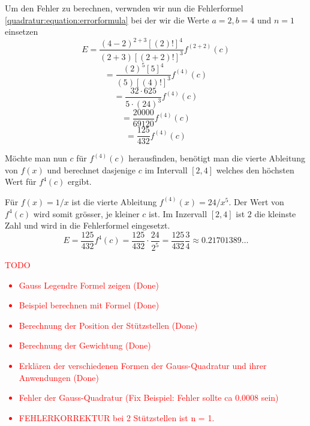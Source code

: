Um den Fehler zu berechnen, verwnden wir nun die Fehlerformel \ref{quadratur:equation:errorformula}
bei der wir die Werte $a = 2, b = 4$ und $n = 1$ einsetzen
\begin{equation*}
    E = \frac{(4-2)^{2+3}[(2)!]^{4}}{(2+3)[(2+2)!]^{3}}f^{(2+2)}(c)
\end{equation*}
\begin{equation*}
    = \frac{(2)^{5}[5]^{4}}{(5)[(4)!]^{3}}f^{(4)}(c)
\end{equation*}
\begin{equation*}
    = \frac{32 \cdot 625}{5 \cdot (24)^{3}}f^{(4)}(c)
\end{equation*}
\begin{equation*}
    = \frac{20000}{69120}f^{(4)}(c)
\end{equation*}
\begin{equation}
    = \frac{125}{432}f^{(4)}(c)
\end{equation}

Möchte man nun $c$ für $f^{(4)}(c)$ herausfinden, benötigt man die 
vierte Ableitung von $f(x)$ und berechnet dasjenige $c$ im Intervall $[2, 4]$ 
welches den höchsten Wert für $f^{4}(c)$ ergibt.

Für $f(x) = 1/x$ ist die vierte Ableitung $f^{(4)}(x) = 24/x^{5}$. 
Der Wert von $f^{4}(c)$ wird somit grösser, je kleiner $c$ ist.
Im Inzervall $[2,4]$ ist $2$ die kleinste Zahl und wird in die Fehlerformel eingesetzt.
\begin{equation}
    E = \frac{125}{432}f^{4}(c) = \frac{125}{432} \cdot \frac{24}{2^{5}} = \frac{125}{432}\frac{3}{4} \approx 0.21701389\dots
\end{equation}


\textcolor{red}{
    TODO
    \begin{itemize}
        \item Gauss Legendre Formel zeigen (Done)
        \item Beispiel berechnen mit Formel (Done)
        \item Berechnung der Position der Stützstellen (Done)
        \item Berechnung der Gewichtung (Done)
        \item Erklären der verschiedenen Formen der Gauss-Quadratur und ihrer Anwendungen (Done)
        \item Fehler der Gauss-Quadratur (Fix Beispiel: Fehler sollte ca 0.0008 sein)
        \item FEHLERKORREKTUR bei 2 Stützstellen ist n = 1. 
    \end{itemize}
}
